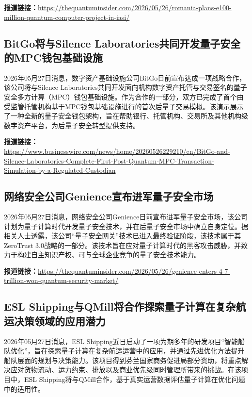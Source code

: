 \documentclass[12pt,a4paper]{ctexart}
\begin{document}
\noindent\textbf{报道链接：}\url{https://thequantuminsider.com/2026/05/26/romania-plans-e100-million-quantum-computer-project-in-iasi/}

\subsection{ BitGo将与Silence Laboratories共同开发量子安全的MPC钱包基础设施 }

2026年05月27日消息，数字资产基础设施公司BitGo日前宣布达成一项战略合作，该公司将与Silence Laboratories共同开发面向机构数字资产托管与交易签名的量子安全多方计算（MPC）钱包基础设施。作为合作的一部分，双方已完成了首个由受监管托管机构基于MPC钱包基础设施进行的首次后量子交易模拟。该演示展示了一种全新的量子安全钱包架构，旨在帮助银行、托管机构、交易所及其他机构级数字资产平台，为后量子安全转型提供支持。

\noindent\textbf{报道链接：}\url{https://www.businesswire.com/news/home/20260526229210/en/BitGo-and-Silence-Laboratories-Complete-First-Post-Quantum-MPC-Transaction-Simulation-by-a-Regulated-Custodian}

\subsection{ 网络安全公司Genience宣布进军量子安全市场 }

2026年05月27日消息，网络安全公司Genience日前宣布进军量子安全市场，该公司计划为量子计算时代开发量子安全技术，并在后量子安全市场中确立自身定位。据相关人士透露，该公司“量子安全网关”技术已进入最终验证阶段，该技术属于其ZeroTrust 3.0战略的一部分。该技术旨在应对量子计算时代的黑客攻击威胁，并致力于构建自主知识产权、可与全球企业竞争的量子安全技术能力。

\noindent\textbf{报道链接：}\url{https://thequantuminsider.com/2026/05/26/genience-enters-4-7-trillion-won-quantum-security-market/}

\subsection{ ESL Shipping与QMill将合作探索量子计算在复杂航运决策领域的应用潜力 }

2026年05月27日消息，ESL Shipping近日启动了一项为期多年的研发项目“智能船队优化”，旨在探索量子计算在复杂航运运营中的应用，并通过先进优化方法提升船队层面的规划与决策能力。该项目得到芬兰国家商务促进局部分资助，将重点解决应对货物流动、运力约束、排放以及商业优先级同时管理所带来的挑战。在该项目中，ESL Shipping将与QMill合作，基于真实运营数据评估量子计算在优化问题中的适用性。
\end{document}
